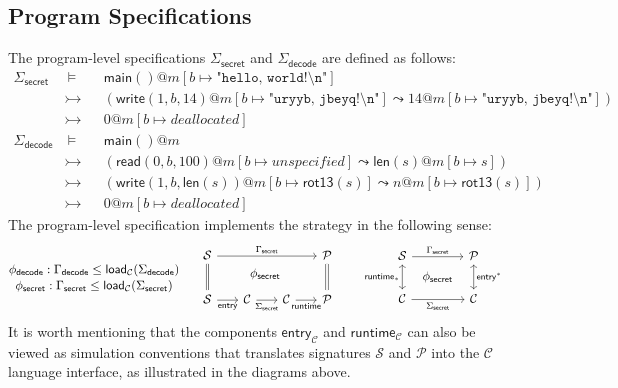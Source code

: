 \documentclass[acmsmall,nonacm]{acmart}
\newcommand{\kw}[1]{\ensuremath{ \mathsf{#1} }}
\begin{document}
\subsection{Program Specifications}

The
program-level specifications
$\Sigma_\kw{secret}$ and $\Sigma_\kw{decode}$
are defined as follows:
{\small
\begin{align*}
  \Sigma_\kw{secret} & \:\vDash\: &&
  \kw{main()}@m[b \mapsto \texttt{"hello, world!\textbackslash{}n"}] \\
  & \rightarrowtail &&
    (\kw{write}(1, b, 14)@m [b \mapsto \texttt{"uryyb, jbeyq!\textbackslash{}n"}]
   \leadsto 14@m[b \mapsto \texttt{"uryyb, jbeyq!\textbackslash{}n"}]) \\
  & \rightarrowtail && 0@m[b \mapsto deallocated] \\
  \Sigma_\kw{decode} & \:\vDash\ &&
  \kw{main()}@m \\
  & \rightarrowtail && ( \kw{read}(0, b, 100)@m[b \mapsto unspecified]
   \leadsto \kw{len}(s)@m[b \mapsto s]) \\
  & \rightarrowtail && (\kw{write}(1, b, \kw{len}(s))@m[b\mapsto \kw{rot13}(s)]
   \leadsto n@m[b\mapsto \kw{rot13}(s)]) \\
  & \rightarrowtail && 0@m[b \mapsto deallocated]
\end{align*}}
The program-level specification
implements the strategy
in the following sense:
{\small
\[
  \begin{prooftree}
    \hypo{\phi_\kw{decode}: \Gamma_\kw{decode} \le \kw{load}_\mathcal{C}(\Sigma_\kw{decode})}
    \infer[no rule]1
    {\phi_\kw{secret}: \Gamma_\kw{secret} \le \kw{load}_\mathcal{C}(\Sigma_\kw{secret})}
  \end{prooftree}
  \quad
  \begin{array}{c}
    \begin{tikzcd}[row sep=2.5ex, column sep=4ex]
      \mathcal{S} \ar[dd, equal]
      \ar[rrr, "\Gamma_\kw{secret}"]
       &&&
      \mathcal{P} \ar[dd, equal] \\
      & &|[xshift=-4ex, overlay]| \phi_\kw{secret} & \\
      \mathcal{S} \ar[r, "\kw{entry}"'] & \mathcal{C} \ar[r, "\Sigma_\kw{secret}"'] & \mathcal{C}\ar[r, "\kw{runtime}"']  & \mathcal{P}
    \end{tikzcd}
  \end{array}
  \quad
  \begin{array}{c}
    \begin{tikzcd}[row sep=0.5ex, column sep=1ex]
      \mathcal{S} \ar[dd, leftrightarrow, "\kw{runtime}_*"']
	  \ar[rr, "\Gamma_\kw{secret}"] &&
      \mathcal{P} \ar[dd, leftrightarrow, "\kw{entry}^*"] \\
      & \phi_\kw{secret} & \\
      \mathcal{C} \ar[rr, "\Sigma_\kw{secret}"'] &&
      \mathcal{C}
    \end{tikzcd}
  \end{array}
\]}%
It is worth mentioning that
the components $\kw{entry}_\mathcal{C}$ and $\kw{runtime}_\mathcal{C}$
can also be viewed as simulation conventions
that translates signatures $\mathcal{S}$ and $\mathcal{P}$
into the $\mathcal{C}$ language interface,
as illustrated in the diagrams above.
\end{document}
